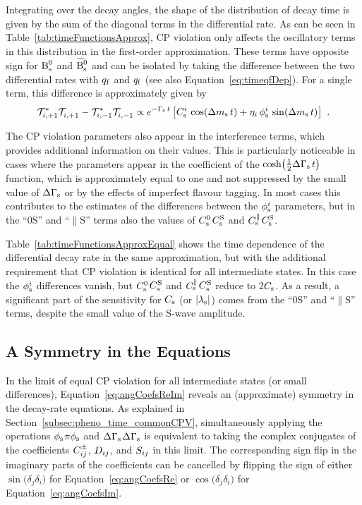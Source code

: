 Integrating over the decay angles, the shape of the distribution of decay time is given by the sum of the diagonal terms in the
differential rate. As can be seen in Table~\ref{tab:timeFunctionsApprox}, CP violation only affects the oscillatory terms in this
distribution in the first-order approximation. These terms have opposite sign for $\Bs$ and $\Bsbar$ and can be isolated by taking the
difference between the two differential rates with $\qf$\texteq{} and $\qf$\texteq{} (see also Equation~\ref{eq:timeqfDep}). For a
single term, this difference is approximately given by
\begin{equation}
  \label{eq:timeOscill}
  \timeAmp[i,+1]^*\timeAmp[i,+1]^{\phantom{*}} - \timeAmp[i,-1]^*\timeAmp[i,-1]^{\phantom{*}}
    \propto \eGst\left[ \Csi\,\cDms + \eta_i\,\phisi\,\sDms \right] \ .
\end{equation}

The CP violation parameters also appear in the interference terms, which provides additional information on their values. This is
particularly noticeable in cases where the parameters appear in the coefficient of the $\cDGs$ function, which is approximately equal to
one and not suppressed by the small value of $\DGs$ or by the effects of imperfect flavour tagging. In most cases this contributes to the
estimates of the differences between the $\phisi$ parameters, but in the ``0S'' and ``$\parallel$S'' terms also the values of
$\Cszero$\textplus$\CsS$ and $\Cspar$\textplus$\CsS$.

Table~\ref{tab:timeFunctionsApproxEqual} shows the time dependence of the differential decay rate in the same approximation, but with the
additional requirement that CP violation is identical for all intermediate states. In this case the $\phisi$ differences vanish, but
$\Cszero$\textplus$\CsS$ and $\Cspar$\textplus$\CsS$ reduce to 2$\Cs$. As a result, a significant part of the sensitivity for $\Cs$ (or
$\lamsAbs$) comes from the ``0S'' and ``$\parallel$S'' terms, despite the small value of the S-wave amplitude.


\subsection{A Symmetry in the Equations}
\label{subsec:pheno_equations_symmetry}

In the limit of equal CP violation for all intermediate states (or small differences), Equation~\ref{eq:angCoefsReIm} reveals an
(approximate) symmetry in the decay-rate equations. As explained in Section~\ref{subsec:pheno_time_commonCPV}, simultaneously applying the
operations $\phis$\textto$\pi$\textminus$\phis$ and $\DGs$\textto\tm$\DGs$ is equivalent to taking the complex conjugates of the
coefficients $\Cf[ij]^\pm$, $\Df[ij]$, and $\Sf[ij]$ in this limit. The corresponding sign flip in the imaginary parts of the coefficients
can be cancelled by flipping the sign of either $\sin(\delta_j$\textminus$\delta_i)$ for Equation~\ref{eq:angCoefsRe} or
$\cos(\delta_j$\textminus$\delta_i)$ for Equation~\ref{eq:angCoefsIm}.

